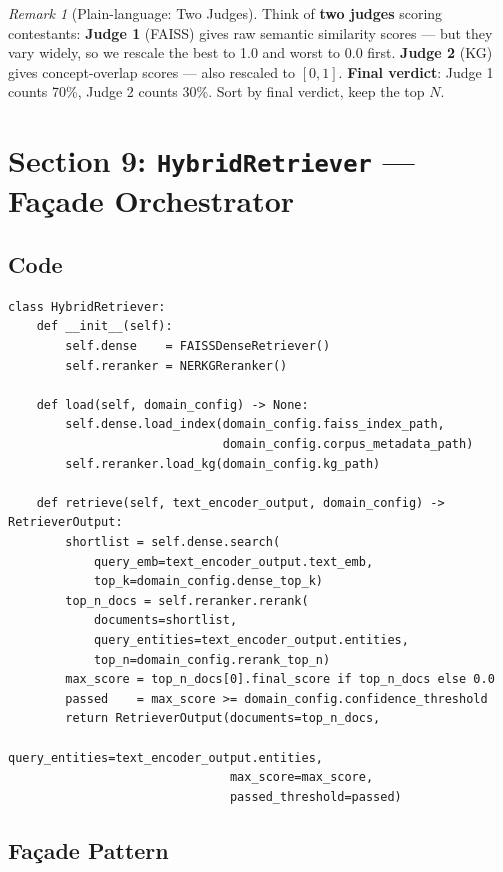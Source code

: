 \documentclass[12pt,a4paper]{article}
\theoremstyle{definition}
\theoremstyle{remark}
\newtheorem{remark}[theorem]{Remark}
\begin{document}
\begin{remark}[Plain-language: Two Judges]
Think of \textbf{two judges} scoring contestants:
\textbf{Judge 1} (FAISS) gives raw semantic similarity scores ---
but they vary widely, so we rescale the best to 1.0 and worst to 0.0 first.
\textbf{Judge 2} (KG) gives concept-overlap scores --- also rescaled to $[0,1]$.
\textbf{Final verdict}: Judge 1 counts 70\%, Judge 2 counts 30\%.
Sort by final verdict, keep the top $N$.
\end{remark}

\section{Section 9: \texttt{HybridRetriever} --- Façade Orchestrator}

\subsection{Code}

\begin{lstlisting}[caption={\texttt{HybridRetriever} class}]
class HybridRetriever:
    def __init__(self):
        self.dense    = FAISSDenseRetriever()
        self.reranker = NERKGReranker()

    def load(self, domain_config) -> None:
        self.dense.load_index(domain_config.faiss_index_path,
                              domain_config.corpus_metadata_path)
        self.reranker.load_kg(domain_config.kg_path)

    def retrieve(self, text_encoder_output, domain_config) -> RetrieverOutput:
        shortlist = self.dense.search(
            query_emb=text_encoder_output.text_emb,
            top_k=domain_config.dense_top_k)
        top_n_docs = self.reranker.rerank(
            documents=shortlist,
            query_entities=text_encoder_output.entities,
            top_n=domain_config.rerank_top_n)
        max_score = top_n_docs[0].final_score if top_n_docs else 0.0
        passed    = max_score >= domain_config.confidence_threshold
        return RetrieverOutput(documents=top_n_docs,
                               query_entities=text_encoder_output.entities,
                               max_score=max_score,
                               passed_threshold=passed)
\end{lstlisting}

\subsection{Façade Pattern}
\end{document}
